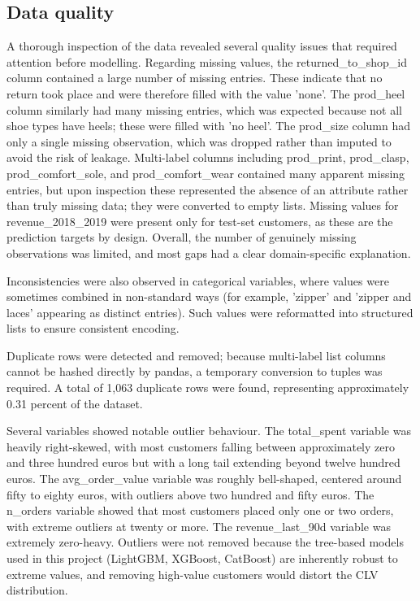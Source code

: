 \subsection{Data quality}
A thorough inspection of the data revealed several quality issues that required attention before modelling. Regarding missing values, the returned\_to\_shop\_id column contained a large number of missing entries. These indicate that no return took place and were therefore filled with the value 'none'. The prod\_heel column similarly had many missing entries, which was expected because not all shoe types have heels; these were filled with 'no heel'. The prod\_size column had only a single missing observation, which was dropped rather than imputed to avoid the risk of leakage. Multi-label columns including prod\_print, prod\_clasp, prod\_comfort\_sole, and prod\_comfort\_wear contained many apparent missing entries, but upon inspection these represented the absence of an attribute rather than truly missing data; they were converted to empty lists. Missing values for revenue\_2018\_2019 were present only for test-set customers, as these are the prediction targets by design. Overall, the number of genuinely missing observations was limited, and most gaps had a clear domain-specific explanation.

Inconsistencies were also observed in categorical variables, where values were sometimes combined in non-standard ways (for example, 'zipper' and 'zipper and laces' appearing as distinct entries). Such values were reformatted into structured lists to ensure consistent encoding.

Duplicate rows were detected and removed; because multi-label list columns cannot be hashed directly by pandas, a temporary conversion to tuples was required. A total of 1,063 duplicate rows were found, representing approximately 0.31 percent of the dataset.

Several variables showed notable outlier behaviour. The total\_spent variable was heavily right-skewed, with most customers falling between approximately zero and three hundred euros but with a long tail extending beyond twelve hundred euros. The avg\_order\_value variable was roughly bell-shaped, centered around fifty to eighty euros, with outliers above two hundred and fifty euros. The n\_orders variable showed that most customers placed only one or two orders, with extreme outliers at twenty or more. The revenue\_last\_90d variable was extremely zero-heavy. Outliers were not removed because the tree-based models used in this project (LightGBM, XGBoost, CatBoost) are inherently robust to extreme values, and removing high-value customers would distort the CLV distribution.


